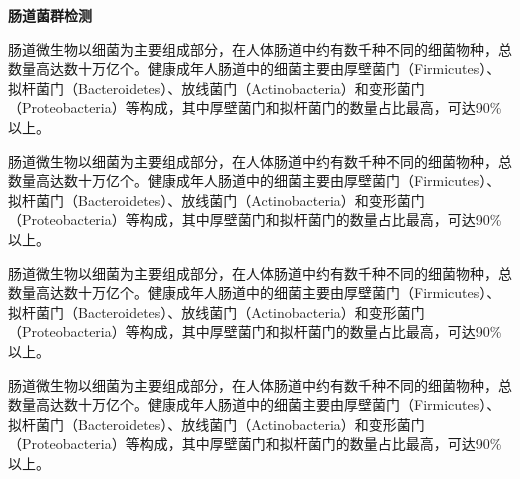 \documentclass[UTF8]{ctexart}
\begin{document}
\newpage

\begin{tcolorbox}[
enhanced,
colback=white,
colframe=customTeal,
arc=2mm,
boxrule=1pt,
left=20pt,
right=20pt,
top=12pt,
bottom=12pt,
width=\textwidth,
fontupper=\sffamily,
overlay={
\draw[customTeal, line width=2pt]
([xshift=15pt]frame.south west) -- ([xshift=-15pt]frame.south east);
}
]
{\Large\bfseries\textcolor{customTeal}{\Huge 肠道菌群检测}}
\end{tcolorbox}

\begin{tcolorbox}[
    enhanced,
    colback=gray!3,
    colframe=gray!3,
    arc=3mm,
    boxrule=0pt,
    width=\textwidth,
    top=8pt,
    bottom=8pt
]
{\small{\color{gray}\faInfoCircle} 肠道微生物以细菌为主要组成部分，在人体肠道中约有数千种不同的细菌物种，总数量高达数十万亿个。健康成年人肠道中的细菌主要由厚壁菌门（Firmicutes）、拟杆菌门（Bacteroidetes）、放线菌门（Actinobacteria）和变形菌门（Proteobacteria）等构成，其中厚壁菌门和拟杆菌门的数量占比最高，可达90\%以上。
}
\end{tcolorbox}
\begin{tcolorbox}[
    enhanced,
    colback=gray!3,
    colframe=gray!3,
    arc=3mm,
    boxrule=0pt,
    width=\textwidth,
    top=8pt,
    bottom=8pt
]
{\small{\color{gray}\faInfoCircle} 肠道微生物以细菌为主要组成部分，在人体肠道中约有数千种不同的细菌物种，总数量高达数十万亿个。健康成年人肠道中的细菌主要由厚壁菌门（Firmicutes）、拟杆菌门（Bacteroidetes）、放线菌门（Actinobacteria）和变形菌门（Proteobacteria）等构成，其中厚壁菌门和拟杆菌门的数量占比最高，可达90\%以上。
}
\end{tcolorbox}
\begin{tcolorbox}[
    enhanced,
    colback=gray!3,
    colframe=gray!3,
    arc=3mm,
    boxrule=0pt,
    width=\textwidth,
    top=8pt,
    bottom=8pt
]
{\small{\color{gray}\faInfoCircle} 肠道微生物以细菌为主要组成部分，在人体肠道中约有数千种不同的细菌物种，总数量高达数十万亿个。健康成年人肠道中的细菌主要由厚壁菌门（Firmicutes）、拟杆菌门（Bacteroidetes）、放线菌门（Actinobacteria）和变形菌门（Proteobacteria）等构成，其中厚壁菌门和拟杆菌门的数量占比最高，可达90\%以上。
}
\end{tcolorbox}
\begin{tcolorbox}[
    enhanced,
    colback=gray!3,
    colframe=gray!3,
    arc=3mm,
    boxrule=0pt,
    width=\textwidth,
    top=8pt,
    bottom=8pt
]
{\small{\color{gray}\faInfoCircle} 肠道微生物以细菌为主要组成部分，在人体肠道中约有数千种不同的细菌物种，总数量高达数十万亿个。健康成年人肠道中的细菌主要由厚壁菌门（Firmicutes）、拟杆菌门（Bacteroidetes）、放线菌门（Actinobacteria）和变形菌门（Proteobacteria）等构成，其中厚壁菌门和拟杆菌门的数量占比最高，可达90\%以上。
}
\end{tcolorbox}
\end{document}
